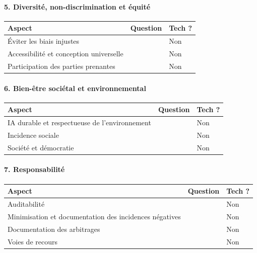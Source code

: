 \documentclass[10pt, french, a4paper]{report}
\begin{document}
\paragraph{5. Diversité, non-discrimination et équité}

\begin{center}
  \begin{tabular}{ |p{4cm}|p{6cm}|p{2cm}| } 
    \hline
    Aspect & Question & Tech ? \\
    \hline
    \hline
    Éviter les biais injustes &  & Non \\
    \hline
    Accessibilité et conception universelle &  & Non \\
    \hline
    Participation des parties prenantes &  & Non \\
    \hline
    
  \end{tabular}
\end{center}

\paragraph{6. Bien-être sociétal et environnemental}

\begin{center}
  \begin{tabular}{ |p{4cm}|p{6cm}|p{2cm}| } 
    \hline
    Aspect & Question & Tech ? \\
    \hline
    \hline
    IA durable et respectueuse de l’environnement &  & Non \\
    \hline
    Incidence sociale &  & Non \\
    \hline
    Société et démocratie &  & Non \\
    \hline
    
  \end{tabular}
\end{center}

\paragraph{7. Responsabilité}

\begin{center}
  \begin{tabular}{ |p{4cm}|p{6cm}|p{2cm}| } 
    \hline
    Aspect & Question & Tech ? \\
    \hline
    \hline
    Auditabilité &  & Non \\
    \hline
    Minimisation et documentation des incidences négatives &  & Non \\
    \hline
    Documentation des arbitrages &  & Non \\
    \hline
    Voies de recours &  & Non \\
    \hline
    
  \end{tabular}
\end{center}
\end{document}
